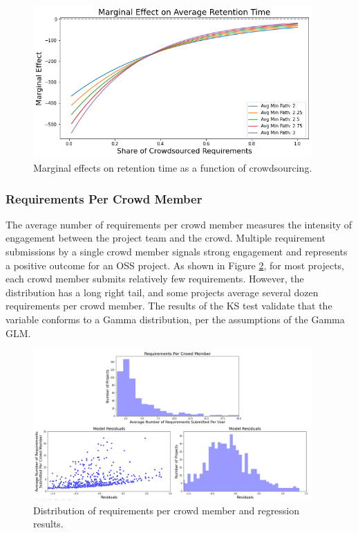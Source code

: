 \begin{figure}
  \includegraphics[width=0.95\textwidth]{retention_time_marginal.PNG}
\caption{Marginal effects on retention time as a function of crowdsourcing.}
\label{retention_time_marginal}
\end{figure}

\subsubsection{Requirements Per Crowd Member}

The average number of requirements per crowd member measures the intensity of engagement between the project team and the crowd. Multiple requirement submissions by a single crowd member signals strong engagement and represents a positive outcome for an OSS project. As shown in Figure \ref{requirements_per_user_results}, for most projects, each crowd member submits relatively few requirements. However, the distribution has a long right tail, and some projects average several dozen requirements per crowd member. The results of the KS test validate that the variable conforms to a Gamma distribution, per the assumptions of the Gamma GLM.

\begin{figure}
  \includegraphics[width=0.95\textwidth]{issues_per_user_results.PNG}
\caption{Distribution of requirements per crowd member and regression results.}
\label{requirements_per_user_results}
\end{figure}

